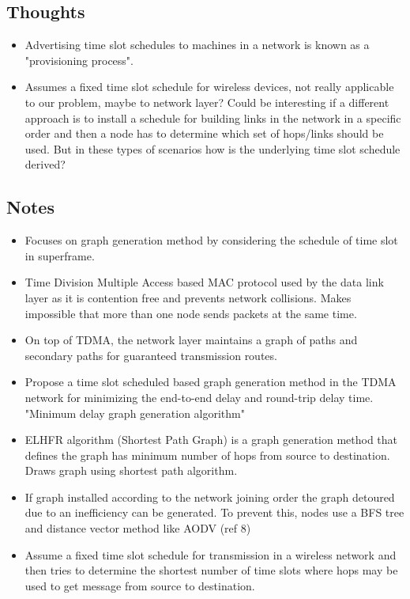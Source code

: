 \documentclass{article}
\begin{document}
\subsection{Thoughts}
\begin{itemize}
    \item Advertising time slot schedules to machines in a network is known as a "provisioning process".
    \item Assumes a fixed time slot schedule for wireless devices, not really applicable to our problem, maybe to network layer?  Could be interesting if a different approach is to install a schedule for building links in the network in a specific order and then a node has to determine which set of hops/links should be used.  But in these types of scenarios how is the underlying time slot schedule derived?
\end{itemize}

\subsection{Notes}
\begin{itemize}
    \item Focuses on graph generation method by considering the schedule of time slot in superframe.
    \item Time Division Multiple Access based MAC protocol used by the data link layer as it is contention free and prevents network collisions.  Makes impossible that more than one node sends packets at the same time.
    \item On top of TDMA, the network layer maintains a graph of paths and secondary paths for guaranteed transmission routes.
    \item Propose a time slot scheduled based graph generation method in the TDMA network for minimizing the end-to-end delay and round-trip delay time.  "Minimum delay graph generation algorithm"
    \item ELHFR algorithm (Shortest Path Graph) is a graph generation method that defines the graph has minimum number of hops from source to destination.  Draws graph using shortest path algorithm.
    \item If graph installed according to the network joining order the graph detoured due to an inefficiency can be generated.  To prevent this, nodes use a BFS tree and distance vector method like AODV (ref 8)
    \item Assume a fixed time slot schedule for transmission in a wireless network and then tries to determine the shortest number of time slots where hops may be used to get message from source to destination.
\end{itemize}
\end{document}
